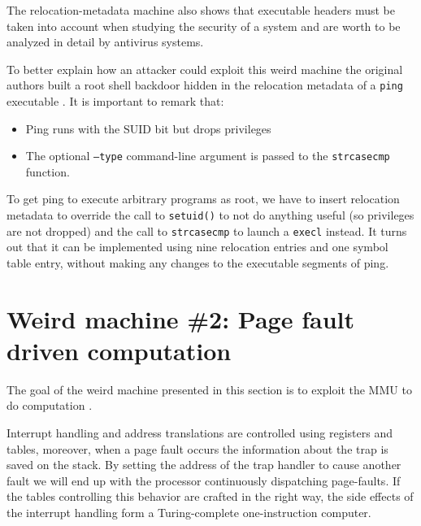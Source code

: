 \documentclass[11pt,twoside,a4paper]{article}
\begin{document}
The relocation-metadata machine also shows that executable headers must be taken into account when studying the security of a system and are worth to be analyzed in detail by antivirus systems.

To better explain how an attacker could exploit this weird machine the original authors built a root shell backdoor hidden in the relocation metadata of a \texttt{ping} executable \cite{ping_elf}. It is important to remark that: 
\begin{itemize}
\item Ping runs with the SUID bit but drops privileges 
\item The optional \texttt{--type} command-line argument is passed to the \texttt{strcasecmp} function.
\end{itemize}

To get ping to execute arbitrary programs as root, we have to insert relocation metadata to override the call to \texttt{setuid()} to not do anything useful (so privileges are not dropped) and the call to \texttt{strcasecmp} to launch a \texttt{execl} instead. It turns out that it can be implemented using nine relocation entries and one symbol table entry, without making any changes to the executable segments of ping.


\section{Weird machine \#2: Page fault driven computation}
The goal of the weird machine presented in this section is to exploit the MMU to do computation \cite{mmu_machine}.

Interrupt handling and address translations are controlled using registers and tables, moreover, when a page fault occurs the information about the trap is saved on the stack. By setting the address of the trap handler to cause another fault we will end up with the processor continuously dispatching page-faults. If the tables controlling this behavior are crafted in the right way, the side effects of the interrupt handling form a Turing-complete one-instruction computer.
\end{document}
